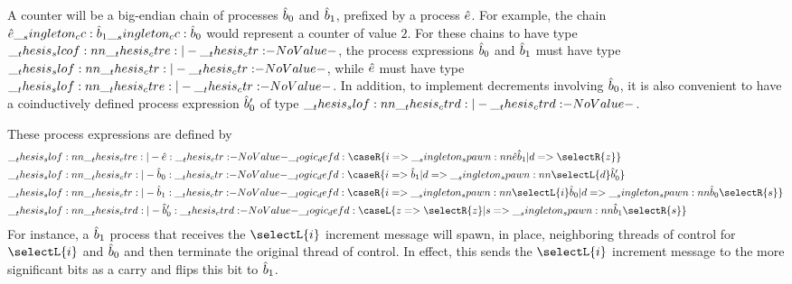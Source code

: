 A counter will be a big-endian chain of processes $\hat{b}_0$ and $\hat{b}_1$, prefixed by a process $\hat{e}$.
For example, the chain $\hat{e} \__singleton_cc: \hat{b}_1 \__singleton_cc: \hat{b}_0$ would represent a counter of value $2$.
For these chains to have type $\slcof{\ctre |- \ctr}$, the process expressions $\hat{b}_0$ and $\hat{b}_1$ must have type $\slof{\ctr |- \ctr}$, while $\hat{e}$ must have type $\slof{\ctre |- \ctr}$.
%
In addition, to implement decrements involving $\hat{b}_0$, it is also convenient to have a coinductively defined process expression $\hat{b}'_0$ of type $\slof{\ctrd |- \ctrd}$.

These process expressions are defined by 
\begin{equation*}
  \begin{lgathered}
    \slof{ \ctre |- \defp{e} : \ctr } \defd
      \caseR{ i => \spawn{\defp{e}}{\defp{b}_1}
            | d => \selectR{z} }
    \\
    \slof{ \ctr |- \defp{b}_0 : \ctr } \defd
      \caseR{ i => \defp{b}_1
            | d => \spawn{\selectL{d}}{\defp{b}'_0} }
    \\
    \slof{ \ctr |- \defp{b}_1 : \ctr } \defd
      \caseR{ i => \spawn{\selectL{i}}{\defp{b}_0}
            | d => \spawn{\defp{b}_0}{\selectR{s}} }
    \\
    \slof{ \ctrd |- \defp{b}'_0 : \ctrd } \defd
      \caseL{ z => \selectR{z}
            | s => \spawn{\defp{b}_1}{\selectR{s}} }
  \end{lgathered}
\end{equation*}
For instance, a $\hat{b}_1$ process that receives the $\selectL{i}$ increment message will spawn, in place, neighboring threads of control for $\selectL{i}$ and $\hat{b}_0$ and then terminate the original thread of control.
In effect, this sends the $\selectL{i}$ increment message to the more significant bits as a carry and flips this bit to $\hat{b}_1$.

